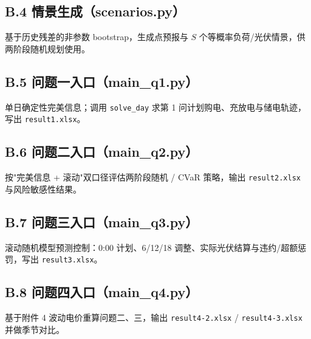 \documentclass[withoutpreface]{cumcmthesis}
\begin{document}
\begin{appendices}
\subsection{B.4 情景生成（scenarios.py）}\label{app:scen}
基于历史残差的非参数 bootstrap，生成点预报与 $S$ 个等概率负荷/光伏情景，供两阶段随机规划使用。


\subsection{B.5 问题一入口（main\_q1.py）}\label{app:q1}
单日确定性完美信息；调用 \texttt{solve\_day} 求第 1 问计划购电、充放电与储电轨迹，写出 \texttt{result1.xlsx}。


\subsection{B.6 问题二入口（main\_q2.py）}\label{app:q2}
按"完美信息 + 滚动"双口径评估两阶段随机 / CVaR 策略，输出 \texttt{result2.xlsx} 与风险敏感性结果。


\subsection{B.7 问题三入口（main\_q3.py）}\label{app:q3}
滚动随机模型预测控制：0:00 计划、6/12/18 调整、实际光伏结算与违约/超额惩罚，写出 \texttt{result3.xlsx}。


\subsection{B.8 问题四入口（main\_q4.py）}\label{app:q4}
基于附件 4 波动电价重算问题二、三，输出 \texttt{result4-2.xlsx} / \texttt{result4-3.xlsx} 并做季节对比。


\end{appendices}
\end{document}
